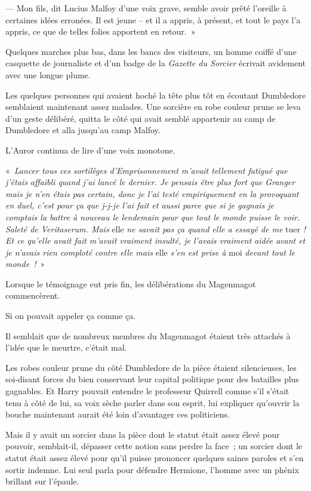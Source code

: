 --- Mon fils, dit Lucius Malfoy d'une voix grave, semble avoir prêté l'oreille à certaines idées erronées. Il est jeune -- et il a appris, à présent, et tout le pays l'a appris, ce que de telles folies apportent en retour.~»

Quelques marches plus bas, dans les bancs des visiteurs, un homme coiffé d'une casquette de journaliste et d'un badge de la \emph{Gazette du Sorcier} écrivait avidement avec une longue plume.

Les quelques personnes qui avaient hoché la tête plus tôt en écoutant Dumbledore semblaient maintenant assez malades. Une sorcière en robe couleur prune se leva d'un geste délibéré, quitta le côté qui avait semblé appartenir au camp de Dumbledore et alla jusqu'au camp Malfoy.

L'Auror continua de lire d'une voix monotone.

«~\emph{Lancer tous ces sortilèges d'Emprisonnement m'avait tellement fatigué que j'étais affaibli quand j'ai lancé le dernier. Je pensais être plus fort que Granger mais je n'en étais pas certain, donc je l'ai testé empiriquement en la provoquant en duel, c'est pour ça que j-j-je l'ai fait et aussi parce que si je gagnais je comptais la battre à nouveau le lendemain pour que tout le monde puisse le voir. Saleté de Veritaserum. Mais} elle \emph{ne savait pas ça quand elle a essayé de me} tuer \emph{! Et ce qu'elle avait fait m'avait vraiment insulté, je l'avais vraiment aidée avant et je n'avais rien comploté contre elle mais} elle \emph{s'en est prise à} moi \emph{devant tout le monde~!}~»

Lorsque le témoignage eut pris fin, les délibérations du Magenmagot commencèrent.

Si on pouvait appeler ça comme ça.

Il semblait que de nombreux membres du Magenmagot étaient très attachés à l'idée que le meurtre, c'était mal.

Les robes couleur prune du côté Dumbledore de la pièce étaient silencieuses, les soi-disant forces du bien conservant leur capital politique pour des batailles plus gagnables. Et Harry pouvait entendre le professeur Quirrell comme s'il s'était tenu à côté de lui, sa voix sèche parler dans son esprit, lui expliquer qu'ouvrir la bouche maintenant aurait été loin d'avantager ces politiciens.

Mais il y avait un sorcier dans la pièce dont le statut était assez élevé pour pouvoir, semblait-il, dépasser cette notion sans perdre la face~; un sorcier dont le statut était assez élevé pour qu'il puisse prononcer quelques saines paroles et s'en sortir indemne. Lui seul parla pour défendre Hermione, l'homme avec un phénix brillant sur l'épaule.

